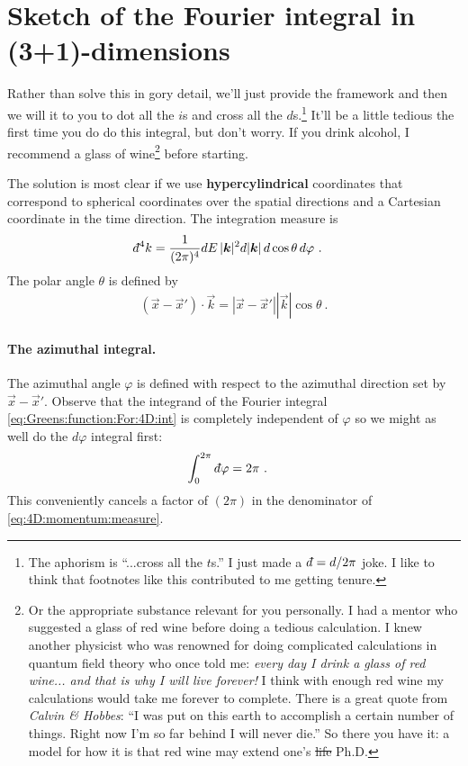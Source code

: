 \documentclass[
  11pt,
	colorful,
	raggedright,
]{tufte-style-thesis-flip}
\renewcommand{\dbar}{d\hspace*{-0.08em}\bar{}\hspace*{0.1em}}
\begin{document}
 


\section{Sketch of the Fourier integral in (3+1)-dimensions}

Rather than solve this in gory detail, we'll just provide the framework and then we will it to you to dot all the $i$s and cross all the $d$s.\footnote{The aphorism is ``...cross all the $t$s.'' I just made a $\dbar = d/2\pi$ joke. I like to think that footnotes like this contributed to me getting tenure.}  It'll be a little tedious the first time you do do this integral, but don't worry. If you drink alcohol, I recommend a glass of wine\footnote{Or the appropriate substance relevant for you personally. I had a mentor who suggested a glass of red wine before doing a tedious calculation. I knew another physicist who was renowned for doing complicated calculations in quantum field theory who once told me: \emph{every day I drink a glass of red wine... and that is why I will live forever!} I think with enough red wine my calculations would take me forever to complete. There is a great quote from \emph{Calvin \& Hobbes}: ``I was put on this earth to accomplish a certain number of things. Right now I’m so far behind I will never die.'' So there you have it: a model for how it is that red wine may extend one's \sout{life} Ph.D.} before starting.

The solution is most clear if we use \textbf{hypercylindrical} coordinates that correspond to spherical coordinates over the spatial directions and a Cartesian coordinate in the time direction. The integration measure is
\begin{align}
  \dbar^4k &= \frac{1}{(2\pi)^4} dE \, |\vec{k}|^2 d|\vec{k}|\, d\cos\theta \, d\varphi \ .
  \label{eq:4D:momentum:measure}
\end{align}
The polar angle $\theta$ is defined by 
\begin{align}
  (\vec{x}-\vec{x}')\cdot \vec{k} = |\vec{x}-\vec{x}'||\vec {k}| \cos\theta \ .
\end{align}

\paragraph{The azimuthal integral.}
The azimuthal angle $\varphi$ is defined with respect to the azimuthal direction set by $\vec{x}-\vec{x}'$. Observe that the integrand of the Fourier integral \eqref{eq:Greens:function:For:4D:int} is completely independent of $\varphi$ so we might as well do the $d\varphi$ integral first:
\begin{align}
  \int_0^{2\pi} \dbar \varphi &= 2\pi \ .
\end{align}
This conveniently cancels a factor of $(2\pi)$ in the denominator of \eqref{eq:4D:momentum:measure}.
\end{document}
